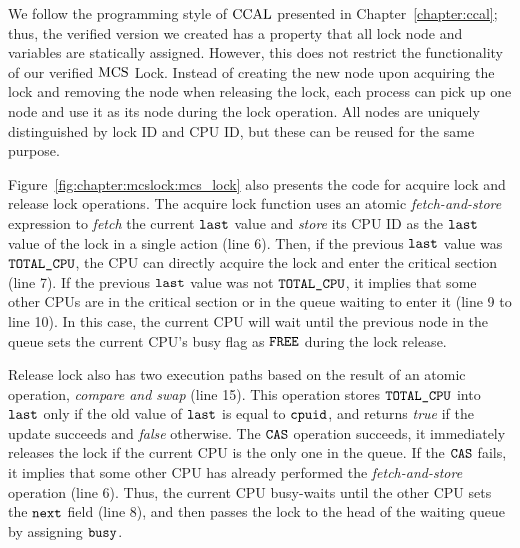 We follow the programming style of $\mathrm{CCAL}$  presented in Chapter~\ref{chapter:ccal}; thus, the verified version we created has a property that all lock node and variables are statically assigned. 
However, this does not restrict the functionality of our verified $\mathrm{MCS}$ Lock. 
Instead of creating the new node upon acquiring the lock and removing the node when releasing the lock, 
each process can pick up one node and use it as its node during the lock operation. 
All nodes are uniquely distinguished by lock ID and CPU ID, but these can be reused for the same purpose.


Figure~\ref{fig:chapter:mcslock:mcs_lock} 
also presents the code for acquire lock and release lock operations. 
The acquire lock function uses an atomic {\em fetch-and-store} expression to {\em fetch} the current ${\mathrm{\texttt{last}}}$ value and  {\em store} its CPU ID as the ${\mathrm{\texttt{last}}}$ value of the lock in a single action (line 6). 
Then, if the previous ${\mathrm{\texttt{last}}}$  value was ${\mathrm{\texttt{TOTAL\_CPU}}}$, the CPU can directly acquire the lock and enter the critical section (line 7). 
If the previous ${\mathrm{\texttt{last}}}$ value was not ${\mathrm{\texttt{TOTAL\_CPU}}}$, it implies that some other CPUs are in the critical section or in the queue waiting to enter it (line 9 to line 10). 
In this case, the current CPU will wait until the previous node in the queue sets the current CPU’s busy flag as ${\mathrm{\texttt{FREE}}}$ during the lock release.

Release lock also has two execution paths based on the result of an atomic operation,  {\em  compare and swap} (line 15). 
This operation stores ${\mathrm{\texttt{TOTAL\_CPU}}}$ into ${\mathrm{\texttt{last}}}$ only if the old value of ${\mathrm{\texttt{last}}}$ is equal to ${\mathrm{\texttt{cpuid}}}$, 
and returns {\em true} if the update succeeds and {\em false} otherwise. 
The ${\mathrm{\texttt{CAS}}}$  operation succeeds, it immediately releases the lock if the current CPU is the only one in the queue.
 If the ${\mathrm{\texttt{CAS}}}$  fails, it implies that some other CPU has already performed the {\em fetch-and-store} operation (line 6). 
 Thus, the current CPU busy-waits until the other CPU sets the ${\mathrm{\texttt{next}}}$ field (line 8), 
 and then passes the lock to the head of the waiting queue by assigning ${\mathrm{\texttt{busy}}}$.


